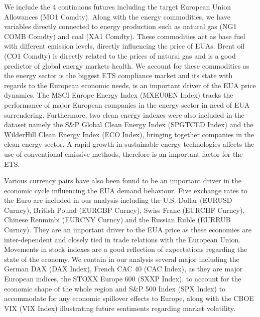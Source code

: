\documentclass[12pt, letterpaper]{article}
\begin{document}
We include the 4 continuous futures including the target European Union Allowances (MO1 Comdty). Along with the energy commodities, we have variables directly connected to energy production such as natural gas (NG1 COMB Comdty) and coal (XA1 Comdty). These commodities act as base fuel with different emission levels, directly influencing the price of EUAs. Brent oil (CO1 Comdty) is directly related to the prices of natural gas and is a good predictor of global energy markets health. We account for these commodities as the energy sector is the biggest ETS compliance market and its state with regards to the European economic needs, is an important driver of the EUA price dynamics. The MSCI Europe Energy Index (MXEU0EN Index) tracks the performance of major European companies in the energy sector in need of EUA surrendering. Furthermore, two clean energy indexes were also included in the dataset namely the S\&P Global Clean Energy Index (SPGTCED Index) and the WilderHill Clean Energy Index (ECO Index), bringing together companies in the clean energy sector. A rapid growth in sustainable energy technologies affects the use of conventional emissive methods, therefore is an important factor for the ETS.

Various currency pairs have also been found to be an important driver in the economic cycle influencing the EUA demand behaviour. Five exchange rates to the Euro are included in our analysis including the U.S. Dollar (EURUSD Curncy), British Pound (EURGBP Curncy), Swiss Franc (EURCHF Curncy), Chinese Renminbi (EURCNY Curncy) and the Russian Ruble (EURRUB Curncy). They are an important driver to the EUA price as these economies are inter-dependent and closely tied in trade relations with the European Union. Movements in stock indexes are a good reflection of expectations regarding the state of the economy. We contain in our analysis several major including the German DAX (DAX Index), French CAC 40 (CAC Index), as they are major European indices, the STOXX Europe 600 (SXXP Index), to account for the economic shape of the whole region and S\&P 500 Index (SPX Index) to accommodate for any economic spillover effects to Europe, along with the CBOE VIX (VIX Index) illustrating future sentiments regarding market volatility.
\end{document}
